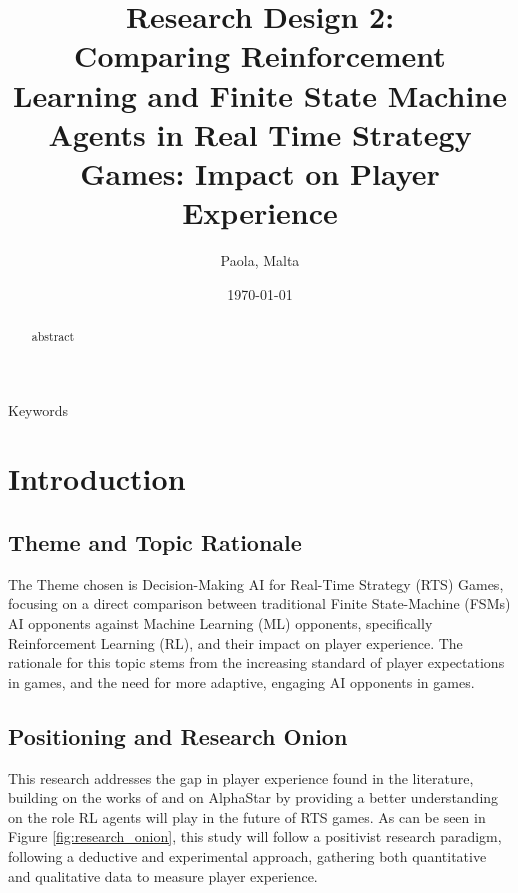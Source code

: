 \documentclass[conference]{IEEEtran}
\begin{document}
\title{Research Design 2:\\ Comparing Reinforcement Learning and Finite State Machine Agents in Real Time Strategy Games: Impact on Player Experience}

\author{
	Paola, Malta
}

\date{\today}

\maketitle

\begin{abstract}
	abstract
\end{abstract}

\begin{IEEEkeywords}
	Keywords
\end{IEEEkeywords}

\section{Introduction}

\subsection{Theme and Topic Rationale}

The Theme chosen is Decision-Making AI for Real-Time Strategy (RTS) Games, focusing on a direct comparison between traditional Finite State-Machine (FSMs) AI opponents against Machine Learning (ML) opponents,
specifically Reinforcement Learning (RL), and their impact on player experience. The rationale for this topic stems from the increasing standard of player expectations in games, and the need for more adaptive,
engaging AI opponents in games.

\subsection{Positioning and Research Onion}
This research addresses the gap in player experience found in the literature, building on the works of \cite{grech_creating_2023} and \cite{vinyals_grandmaster_2019} on AlphaStar by providing a
better understanding on the role RL agents will play in the future of RTS games. As can be seen in Figure \ref{fig:research_onion}, this study will follow a positivist research paradigm,
following a deductive and experimental approach, gathering both quantitative and qualitative data to measure player experience.
\end{document}
